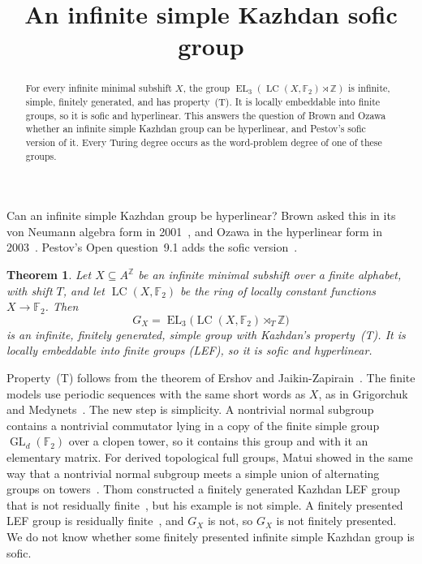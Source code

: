 \documentclass[11pt]{amsart}
\newtheorem{theorem}{Theorem}
\newcommand{\F}{\mathbb F}
\newcommand{\Z}{\mathbb Z}
\newcommand{\LC}{\operatorname{LC}}
\newcommand{\EL}{\operatorname{EL}}
\newcommand{\GL}{\operatorname{GL}}
\begin{document}
\title{An infinite simple Kazhdan sofic group}
\author{\paperauthorname}
\date{}

\begin{abstract}
For every infinite minimal subshift $X$, the group
$\EL_3(\LC(X,\F_2)\rtimes\Z)$ is infinite, simple, finitely generated,
and has property~\textup{(T)}. It is locally embeddable into finite
groups, so it is sofic and hyperlinear. This answers the question of
Brown and Ozawa whether an infinite simple Kazhdan group can be
hyperlinear, and Pestov's sofic version of it. Every Turing degree
occurs as the word-problem degree of one of these groups.
\end{abstract}
\maketitle

Can an infinite simple Kazhdan group be hyperlinear? Brown asked this
in its von Neumann algebra form in 2001~\cite[\S11, Question~7]{Brown},
and Ozawa in the hyperlinear form in 2003~\cite[p.~527]{Ozawa}.
Pestov's Open question~9.1 adds the sofic version~\cite{Pestov}.

\begin{theorem}\label{thm:main}
Let $X\subseteq A^{\Z}$ be an infinite minimal subshift over a finite
alphabet, with shift $T$, and let $\LC(X,\F_2)$ be the ring of locally
constant functions $X\to\F_2$. Then
\[
  G_X=\EL_3\bigl(\LC(X,\F_2)\rtimes_T\Z\bigr)
\]
is an infinite, finitely generated, simple group with Kazhdan's
property~\textup{(T)}. It is locally embeddable into finite groups
\textup{(LEF)}, so it is sofic and hyperlinear.
\end{theorem}

Property~\textup{(T)} follows from the theorem of Ershov and
Jaikin-Zapirain~\cite{EJZ}. The finite models use periodic sequences
with the same short words as $X$, as in Grigorchuk and
Medynets~\cite{GM}. The new step is simplicity. A nontrivial normal
subgroup contains a nontrivial commutator lying in a copy of the finite
simple group $\GL_d(\F_2)$ over a clopen tower, so it contains this
group and with it an elementary matrix. For derived topological full
groups, Matui showed in the same way that a nontrivial normal subgroup
meets a simple union of alternating groups on
towers~\cite[Lemma~3.4 and Theorem~4.9]{Matui}. Thom constructed a
finitely generated Kazhdan LEF group that is not residually
finite~\cite{Thom}, but his example is not simple. A finitely presented
LEF group is residually finite~\cite{VershikGordon}, and $G_X$ is not,
so $G_X$ is not finitely presented. We do not know whether some
finitely presented infinite simple Kazhdan group is sofic.
\end{document}
